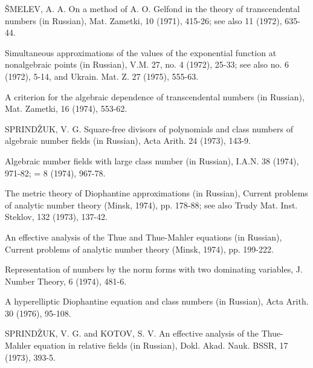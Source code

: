 \begin{hanglist}
    \item ŠMELEV, A. A. On a method of A. O. Gelfond in the theory of transcendental numbers (in Russian), Mat. Zametki, 10 (1971), 415-26; see also 11 (1972), 635-44.
    \item \hspace{1.5em} Simultaneous approximations of the values of the exponential function at nonalgebraic points (in Russian), V.M. 27, no. 4 (1972), 25-33; see also no. 6 (1972), 5-14, and Ukrain. Mat. Z. 27 (1975), 555-63.
    \item \hspace{1.5em} A criterion for the algebraic dependence of transcendental numbers (in Russian), Mat. Zametki, 16 (1974), 553-62.
    \item SPRINDŽUK, V. G. Square-free divisors of polynomials and class numbers of algebraic number fields (in Russian), Acta Arith. 24 (1973), 143-9.
    \item \hspace{1.5em} Algebraic number fields with large class number (in Russian), I.A.N. 38 (1974), 971-82; = 8 (1974), 967-78.
    \item \hspace{1.5em} The metric theory of Diophantine approximations (in Russian), Current problems of analytic number theory (Minsk, 1974), pp. 178-88; see also Trudy Mat. Inst. Steklov, 132 (1973), 137-42.
    \item \hspace{1.5em} An effective analysis of the Thue and Thue-Mahler equations (in Russian), Current problems of analytic number theory (Minsk, 1974), pp. 199-222.
    \item \hspace{1.5em} Representation of numbers by the norm forms with two dominating variables, J. Number Theory, 6 (1974), 481-6.
    \item \hspace{1.5em} A hyperelliptic Diophantine equation and class numbers (in Russian), Acta Arith. 30 (1976), 95-108.
    \item SPRINDŽUK, V. G. and KOTOV, S. V. An effective analysis of the Thue-Mahler equation in relative fields (in Russian), Dokl. Akad. Nauk. BSSR, 17 (1973), 393-5.

\end{hanglist}
